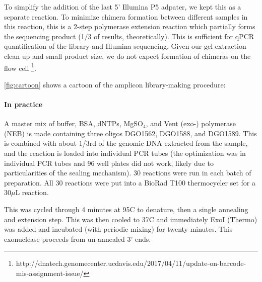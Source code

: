 To simplify the addition of the last 5' Illumina P5 adpater, we kept
this as a separate reaction. To minimize chimera formation between
different samples in this reaction, this is a 2-step polymerase
extension reaction which partially forms the sequencing product (1/3 of
results, theoretically). This is sufficient for qPCR quantification of
the library and Illumina sequencing. Given our gel-extraction clean up
and small product size, we do not expect formation of chimeras on the
flow cell \footnote{http://dnatech.genomecenter.ucdavis.edu/2017/04/11/update-on-barcode-mis-assignment-issue/}.

\autoref{fig:cartoon} shows a cartoon of
the amplicon library-making procedure:


%  

\paragraph{In practice}

A master mix of buffer, BSA, dNTPs, MgSO$_4$, and Vent (exo-)
polymerase (NEB) is made containing three oligos DGO1562, DGO1588, 
and DGO1589.
This is combined with about 1/3rd of the genomic DNA extracted
from the sample, and the reaction is loaded into individual PCR
tubes (the optimization was in individual PCR tubes and 96 well 
plates did not work, likely due to particularities of the sealing
mechanism).
30 reactions were run in each batch of preparation. All 30 reactions
were put into a BioRad T100 thermocycler set for a 30\(\mu\)L
reaction.

This was cycled through 4 minutes at 95C to denature, then a single
annealing and extension step. This was then cooled to 37C and
immediately ExoI (Thermo) was added and incubated (with periodic
mixing) for twenty minutes. This exonuclease proceeds from
un-annealed 3' ends. 

